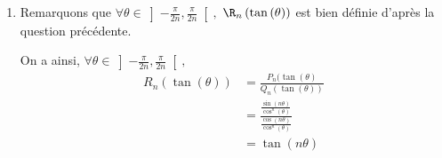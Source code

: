 \begin{correction}
\begin{enumerate}
\begin{enumerate}
  Ainsi $\theta \equiv  \frac{\pi}{2n}\,[\frac{\pi}{n}]$ et comme $\theta \in ]-\frac{\pi}{2},\frac{\pi}{2}[$ on a 
  $$\theta \in \left\{ \frac{\pi+2k\pi }{2n} \, |\, k\in \Z \right\} \cap ]-\frac{\pi}{2},\frac{\pi}{2}[.$$  On trouve alors 
 \begin{align*}
  \theta &\in \left\{ \frac{(2k+1)\pi }{2n} \, |\, k\in \Z \right\}\cap ]-\frac{\pi}{2},\frac{\pi}{2}[ \\
  \theta & \in \left\{ \frac{m\pi }{2n} \, |\, \text{$m$ impair} \right\}\cap ]-\frac{\pi}{2},\frac{\pi}{2}[ \\
  \theta &\in \left\{ \frac{m\pi }{2n} \, |\, -n<m<n, \, \,  \text{$m$ impair}  \right\}
\end{align*}  
La dernière égalité s'obtient en résolvant les inégalités : 
$-\frac{\pi}{2}<\frac{m\pi }{2n} <\frac{\pi}{2}$
  

 En revenant à la variable $x$, on a :
 \begin{align*}
 	 x	& \in \{ \tan\left(   \frac{m\pi }{2n}  \right) \, |\, -n<m<n,\,\,  \text{$m$ impair}\}  
\end{align*}  
%
%
%
%
%

\item Remarquons que  $\forall  \theta \in \left] -\frac{\pi}{2n},\frac{\pi}{2n}\right[, $ $\R_n\left(\tan\left(\theta\right)\right) $ est bien définie d'après la question précédente. 
  
  On a  ainsi, 
$\forall  \theta \in \left] -\frac{\pi}{2n},\frac{\pi}{2n}\right[, $
\begin{align*}
R_n(\tan(\theta)) &= \frac{P_n(\tan(\theta)}{Q_n(\tan(\theta))}\\ 
						&= \frac{\frac{\sin(n\theta)}{\cos^n(\theta)}
}{\frac{\cos(n\theta)}{\cos^n(\theta)}}\\ 
						&=\tan(n\theta)
\end{align*}


\end{enumerate}
\end{enumerate}
\end{correction}
